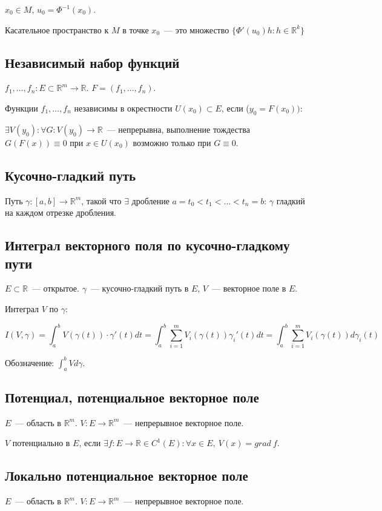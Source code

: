 \documentclass[paper=a4, fontsize=11pt]{article}
\begin{document}
$x_0 \in M$, $u_0 = \Phi^{-1}(x_0)$.

Касательное пространство к $M$ в точке $x_0$~--- это множество
$\{ \Phi'(u_0)h: h \in \mathds{R}^k \}$

\subsection{Независимый набор функций}
$f_1,\dots,f_n:E \subset \mathds{R}^m \to \mathds{R}$. $F = (f_1,\dots,f_n)$.

Функции $f_1,\dots,f_n$ независимы в окрестности $U(x_0) \subset E$, если ($y_0 = F(x_0))$:

$\exists V(y_0): \forall G: V(y_0) \rightarrow \mathds{R}$~--- непрерывна, выполнение тождества $G(F(x)) \equiv 0$ при $x \in U(x_0)$
возможно только при $G \equiv 0$.

\subsection{Кусочно-гладкий путь}
Путь $\gamma: [a,b] \rightarrow \mathds{R}^m$, такой что $\exists$ дробление $a=t_0<t_1<\dots<t_n=b$:
$\gamma$ гладкий на каждом отрезке дробления.

\subsection{Интеграл векторного поля по кусочно-гладкому пути}
$E \subset \mathds{R}$~--- открытое. $\gamma$~--- кусочно-гладкий путь в $E$, $V$~--- векторное поле в $E$.

Интеграл $V$ по $\gamma$:

$$I(V, \gamma) = \int_a^b V(\gamma(t)) \cdot \gamma'(t) dt = \int_a^b \sum_{i=1}^m V_i(\gamma(t)) \gamma_i'(t) dt =
\int_a^b \sum_{i=1}^m V_i(\gamma(t)) d\gamma_i(t) $$

Обозначение: $\int_a^b V d\gamma$.

\subsection{Потенциал, потенциальное векторное поле}
$E$~--- область в $\mathds{R}^m$. $V: E \rightarrow \mathds{R}^m$~--- непрерывное векторное поле.

$V$ потенциально в $E$, если $\exists f: E \rightarrow \mathds{R} \in C^1(E): \forall x \in E, \ V(x) = grad\ f$.

\subsection{Локально потенциальное векторное поле}
$E$~--- область в $\mathds{R}^m$. $V: E \rightarrow \mathds{R}^m$~--- непрерывное векторное поле.
\end{document}
